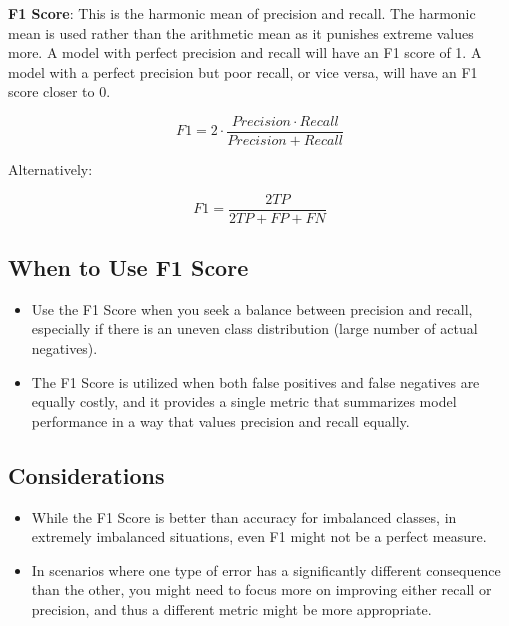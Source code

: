 \textbf{F1 Score}: This is the harmonic mean of precision and recall. The harmonic mean is used rather than the arithmetic mean as it punishes extreme values more. A model with perfect precision and recall will have an F1 score of 1. A model with a perfect precision but poor recall, or vice versa, will have an F1 score closer to 0.

\[
    F1 = 2 \cdot \frac{Precision \cdot Recall}{Precision + Recall}
\]

Alternatively:

\[
    F1 = \frac{2TP}{2TP + FP + FN}
\]

\subsection*{When to Use F1 Score}

\begin{itemize}
    \item Use the F1 Score when you seek a balance between precision and recall, especially if there is an uneven class distribution (large number of actual negatives).
    \item The F1 Score is utilized when both false positives and false negatives are equally costly, and it provides a single metric that summarizes model performance in a way that values precision and recall equally.
\end{itemize}

\subsection*{Considerations}

\begin{itemize}
    \item While the F1 Score is better than accuracy for imbalanced classes, in extremely imbalanced situations, even F1 might not be a perfect measure.
    \item In scenarios where one type of error has a significantly different consequence than the other, you might need to focus more on improving either recall or precision, and thus a different metric might be more appropriate.
\end{itemize}





